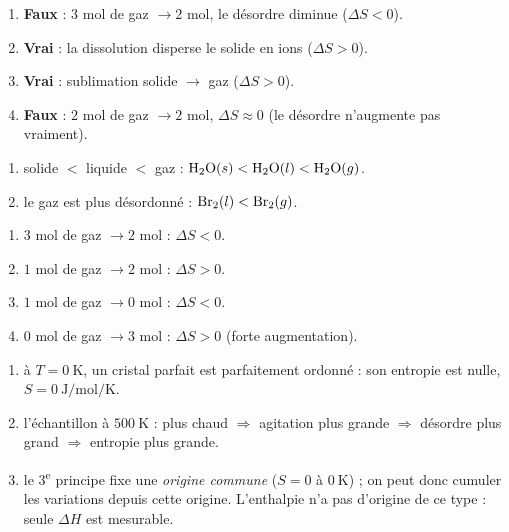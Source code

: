 \documentclass[11pt,a4paper]{article}
\begin{document}
\begin{corrige}
\begin{enumerate}[label=\alph*)]
  \item \textbf{Faux} : $3$ mol de gaz $\to 2$ mol, le désordre diminue ($\Delta S<0$).
  \item \textbf{Vrai} : la dissolution disperse le solide en ions ($\Delta S>0$).
  \item \textbf{Vrai} : sublimation solide $\to$ gaz ($\Delta S>0$).
  \item \textbf{Faux} : $2$ mol de gaz $\to 2$ mol, $\Delta S\approx 0$ (le désordre n'augmente pas vraiment).
\end{enumerate}
\end{corrige}

\begin{corrige}
\begin{enumerate}[label=\alph*)]
  \item solide $<$ liquide $<$ gaz : \; $\ce{H2O}(s) < \ce{H2O}(l) < \ce{H2O}(g)$.
  \item le gaz est plus désordonné : \; $\ce{Br2}(l) < \ce{Br2}(g)$.
\end{enumerate}
\end{corrige}

\begin{corrige}
\begin{enumerate}[label=\alph*)]
  \item $3$ mol de gaz $\to 2$ mol : $\Delta S<0$.
  \item $1$ mol de gaz $\to 2$ mol : $\Delta S>0$.
  \item $1$ mol de gaz $\to 0$ mol : $\Delta S<0$.
  \item $0$ mol de gaz $\to 3$ mol : $\Delta S>0$ (forte augmentation).
\end{enumerate}
\end{corrige}

\begin{corrige}
\begin{enumerate}[label=\alph*)]
  \item à $T=\qty{0}{\kelvin}$, un cristal parfait est parfaitement ordonné : son entropie est nulle, $S=\qty{0}{\joule\per\mol\per\kelvin}$.
  \item l'échantillon à $\qty{500}{\kelvin}$ : plus chaud $\Rightarrow$ agitation plus grande $\Rightarrow$ désordre plus grand $\Rightarrow$ entropie plus grande.
  \item le 3\textsuperscript{e} principe fixe une \emph{origine commune} ($S=0$ à $\qty{0}{\kelvin}$) ; on peut donc cumuler les variations depuis cette origine. L'enthalpie n'a pas d'origine de ce type : seule $\Delta H$ est mesurable.
\end{enumerate}
\end{corrige}
\end{document}
